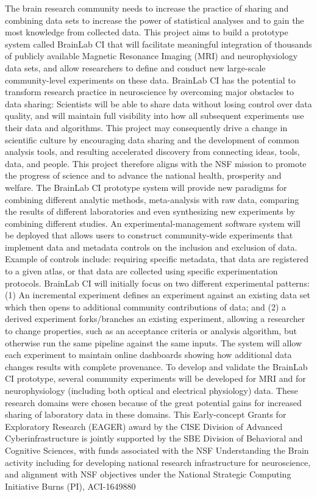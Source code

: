 \documentclass[10pt,colorlinks=true,urlcolor=blue]{moderncv}
\begin{document}
    {
    The brain research community needs to increase the practice of sharing and combining data sets to increase the power of statistical analyses and to gain the most knowledge from collected data. This project aims to build a prototype system called BrainLab CI that will facilitate meaningful integration of thousands of publicly available Magnetic Resonance Imaging (MRI) and neurophysiology data sets, and allow researchers to define and conduct new large-scale community-level experiments on these data. BrainLab CI has the potential to transform research practice in neuroscience by overcoming major obstacles to data sharing: Scientists will be able to share data without losing control over data quality, and will maintain full visibility into how all subsequent experiments use their data and algorithms. This project may consequently drive a change in scientific culture by encouraging data sharing and the development of common analysis tools, and resulting accelerated discovery from connecting ideas, tools, data, and people. This project therefore aligns with the NSF mission to promote the progress of science and to advance the national health, prosperity and welfare.
%
The BrainLab CI prototype system will provide new paradigms for combining different analytic methods, meta-analysis with raw data, comparing the results of different laboratories and even synthesizing new experiments by combining different studies. An experimental-management software system will be deployed that allows users to construct community-wide experiments that implement data and metadata controls on the inclusion and exclusion of data. Example of controls include: requiring specific metadata, that data are registered to a given atlas, or that data are collected using specific experimentation protocols. BrainLab CI will initially focus on two different experimental patterns: (1) An incremental experiment defines an experiment against an existing data set which then opens to additional community contributions of data; and (2) a derived experiment forks/branches an existing experiment, allowing a researcher to change properties, such as an acceptance criteria or analysis algorithm, but otherwise run the same pipeline against the same inputs. The system will allow each experiment to maintain online dashboards showing how additional data changes results with complete provenance. To develop and validate the BrainLab CI prototype, several community experiments will be developed for MRI and for neurophysiology (including both optical and electrical physiology) data. These research domains were chosen because of the great potential gains for increased sharing of laboratory data in these domains.
%
This Early-concept Grants for Exploratory Research (EAGER) award by the
CISE Division of Advanced Cyberinfrastructure is jointly supported by
the SBE Division of Behavioral and Cognitive Sciences, with funds
associated with the NSF Understanding the Brain activity including for
developing national research infrastructure for neuroscience, and
alignment with NSF objectives under the National Strategic Computing
Initiative%
    }
    {Burns (PI), ACI-1649880}{}
\end{document}
